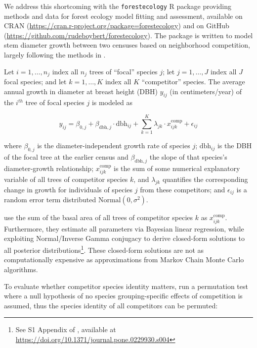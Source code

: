 \documentclass[12pt]{article}
\begin{document}
We address this shortcoming with the \texttt{forestecology} R package
providing methods and data for forest ecology model fitting and
assessment, available on CRAN
(\url{https://cran.r-project.org/package=forestecology}) and on GitHub
(\url{https://github.com/rudeboybert/forestecology}). The package is
written to model stem diameter growth between two censuses based on
neighborhood competition, largely following the methods in
\citet{allen_permutation_2020}.

Let \(i = 1, \ldots, n_j\) index all \(n_j\) trees of ``focal'' species
\(j\); let \(j = 1, \ldots, J\) index all \(J\) focal species; and let
\(k = 1, \ldots, K\) index all \(K\) ``competitor'' species. The average
annual growth in diameter at breast height (DBH) \(y_{ij}\) (in
centimeters/year) of the \(i^{th}\) tree of focal species \(j\) is
modeled as

\begin{equation}
\label{eq:model}
y_{ij} = \beta_{0,j} + \beta_{\text{dbh},j} \cdot \text{dbh}_{ij} + \sum_{k=1}^{K} \lambda_{jk} \cdot x^{\text{comp}}_{ijk} + \epsilon_{ij}
\end{equation}

where \(\beta_{0,j}\) is the diameter-independent growth rate of species
\(j\); \(\text{dbh}_{ij}\) is the DBH of the focal tree at the earlier
census and \(\beta_{\text{dbh},j}\) the slope of that species's
diameter-growth relationship; \(x^{\text{comp}}_{ijk}\) is the sum of
some numerical explanatory variable of all trees of competitor species
\(k\), and \(\lambda_{jk}\) quantifies the corresponding change in
growth for individuals of species \(j\) from these competitors; and
\(\epsilon_{ij}\) is a random error term distributed
\(\text{Normal}(0, \sigma^2)\).

\citet{allen_permutation_2020} use the sum of the basal area of all
trees of competitor species \(k\) as \(x^{\text{comp}}_{ijk}\).
Furthermore, they estimate all parameters via Bayesian linear
regression, while exploiting Normal/Inverse Gamma conjugacy to derive
closed-form solutions to all posterior distributions\footnote{See S1
  Appendix of \citet{allen_permutation_2020}, available at
  \url{https://doi.org/10.1371/journal.pone.0229930.s004}}. These
closed-form solutions are not as computationally expensive as
approximations from Markov Chain Monte Carlo algorithms.

To evaluate whether competitor species identity matters,
\citet{allen_permutation_2020} run a permutation test where a null
hypothesis of no species grouping-specific effects of competition is
assumed, thus the species identity of all competitors can be permuted:
\end{document}
